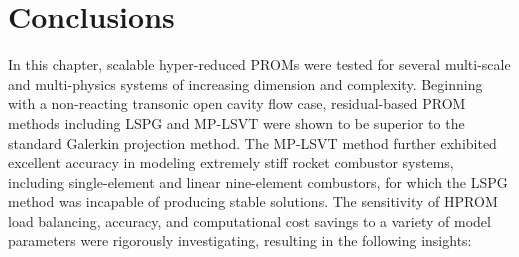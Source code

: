 \section{Conclusions}

In this chapter, scalable hyper-reduced PROMs were tested for several multi-scale and multi-physics systems of increasing dimension and complexity. Beginning with a non-reacting transonic open cavity flow case, residual-based PROM methods including LSPG and MP-LSVT were shown to be superior to the standard Galerkin projection method. The MP-LSVT method further exhibited excellent accuracy in modeling extremely stiff rocket combustor systems, including single-element and linear nine-element combustors, for which the LSPG method was incapable of producing stable solutions. The sensitivity of HPROM load balancing, accuracy, and computational cost savings to a variety of model parameters were rigorously investigating, resulting in the following insights:

